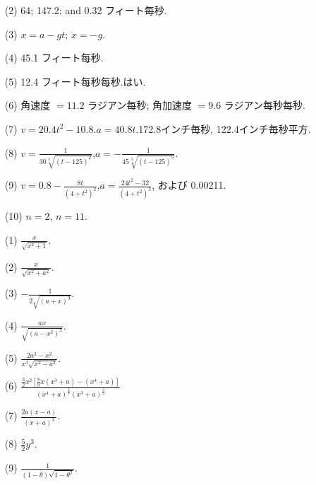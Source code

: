 \documentclass[a4paper,11pt,openany]{ltjsbook}
\begin{document}
\begin{enumerate}
\item[(2)] 64; 147.2; and 0.32 フィート每秒.

\item[(3)] \( x = a - gt \); \(\ddot{x} = -g\).

\item[(4)] 45.1 フィート每秒.

\item[(5)] 12.4 フィート每秒每秒.\quad はい.

\item[(6)] 角速度 \(= 11.2\) ラジアン每秒; 角加速度 \(= 9.6\) ラジアン每秒每秒.

\item[(7)] \( v = 20.4t^2 - 10.8 \).\quad \( a = 40.8t \).\quad 172.8インチ毎秒, 122.4インチ毎秒平方.

\item[(8)] \( v = \frac{1}{30 \sqrt[3]{(t - 125)^2}} \),\quad \( a = - \frac{1}{45 \sqrt[3]{(t - 125)^5}} \).

\item[(9)] \( v = 0.8 - \frac{8t}{(4 + t^2)^2} \),\quad \( a = \frac{24t^2 - 32}{(4 + t^2)^3} \), および 0.00211.

\item[(10)] \( n = 2 \), \( n = 11 \).

\par\smallskip

\end{enumerate}
\par\bigskip\noindent{\Large\bfseries [演習 VI の解答]}\par\smallskip

\begin{enumerate}
\item[(1)]  \(\frac{x}{\sqrt{ x^2 + 1}}\).
\item[(2)]  \(\frac{x}{\sqrt{ x^2 + a^2}}\).
\item[(3)]  \(- \frac{1}{2 \sqrt{(a + x)^3}}\).

\item[(4)]  \(\frac{ax}{\sqrt{(a - x^2)^3}}\).
\item[(5)]  \(\frac{2a^2 - x^2}{x^3 \sqrt{ x^2 - a^2}}\).

\item[(6)]  \(\frac{\frac{3}{2} x^2 \left[ \frac{8}{9} x \left( x^3 + a \right) - \left( x^4 + a \right) \right]}{(x^4 + a)^{\frac{2}{3}} (x^3 + a)^{\frac{3}{2}}}\)
\item[(7)]  \(\frac{2a \left(x - a \right)}{(x + a)^3}\).

\item[(8)]  \(\frac{5}{2} y^3\).
\item[(9)]  \(\frac{1}{(1 - \theta) \sqrt{1 - \theta^2}}\).
\par\smallskip

\end{enumerate}
\par\bigskip{}\par\smallskip
\end{document}
